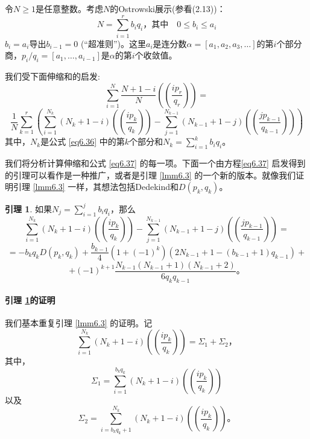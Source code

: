 \documentclass[11pt,a4paper]{article}
\theoremstyle{definition}
\newtheorem{lemma}{\textbf{引理}}[section]
\newcommand{\refeq}[1]{公式 \ref{#1}}
\newcommand{\reflmm}[1]{引理 \ref{#1}}
\numberwithin{equation}{section}
\newcommand{\comma}{\text{，}}
\newcommand{\juhao}{\text{。}}
\newcommand{\parquo}[1]{$ p_{#1}/q_{#1}=\left[a_{1},\ldots,a_{#1-1}\right] $}
\newcommand{\myone}[1]{\left(-1\right)^{#1}}
\newcommand{\ddbrace}[1]{\left(\left(#1\right)\right)}
\begin{document}
令$ N\geq1 $是任意整数。考虑$ N $的Ostrowski展示(参看(2.13))：
\begin{equation}\label{eq6.36}
N=\sum_{i=1}^{r}b_{i}q_{i}\comma \text{其中} \quad 0\leq b_{i}\leq a_{i} 
\end{equation}
$ b_{i}=a_{i} $导出$ b_{i-1}=0 $ (``超准则'')。这里$ a_{i} $是连分数$ \alpha=\left[a_{1},a_{2},a_{3},\ldots\right]$的第$ i $个部分商，\parquo{i}是$ \alpha $的第$ i $个收敛值。

我们受下面伸缩和的启发:
\begin{equation}\label{eq6.37}
\sum_{i=1}^{N}\dfrac{N+1-i}{N}\ddbrace{\dfrac{ip_{r}}{q_{r}}}=
\end{equation}
\[ \dfrac{1}{N}\sum_{k=1}^{r}\left(\sum_{i=1}^{N_{k}}\left(N_{k}+1-i\right)\ddbrace{\dfrac{ip_{k}}{q_{k}}}-\sum_{j=1}^{N_{k-1}}\left(N_{k-1}+1-j\right)\ddbrace{\dfrac{jp_{k-1}}{q_{k-1}}}\right) \]
其中，$ N_{k} $是\refeq{eq6.36} 中的第$ k  $个部分和$ N_{k}=\sum_{i=1}^{k}b_{i}q_{i} $。

我们将分析计算伸缩和\refeq{eq6.37} 的每一项。下面一个由方程\ref{eq6.37} 启发得到的引理可以看作是一种推广，或者是\reflmm{lmm6.3} 的一个新的版本。就像我们证明\reflmm{lmm6.3} 一样，其想法包括Dedekind和$ D\left(p_{k},q_{k}\right) $。
\begin{lemma}\label{lmm6.4}
	如果$ N_{j}=\sum_{i=1}^{j}b_{i}q_{i} $，那么
\[ 	\sum_{i=1}^{N_{k}}\left(N_{k}+1-i\right)\ddbrace{\dfrac{ip_{k}}{q_{k}}}-\sum_{j=1}^{N_{k-1}}\left(N_{k-1}+1-j\right)\ddbrace{\dfrac{jp_{k-1}}{q_{k-1}}}= \]
\[ =-b_{k}q_{k}D\left(p_{k},q_{k}\right)+\dfrac{b_{k-1}}{4}\left(1+\myone{k}\right)\left(2N_{k-1}+1-\left(b_{k-1}+1\right)q_{k-1}\right)+ \]
	\begin{equation}\label{eq6.38}
	+\myone{k+1}\dfrac{N_{k-1}\left(N_{k-1}+1\right)\left(N_{k-1}+2\right)}{6q_{k}q_{k-1}}\juhao
	\end{equation}
\end{lemma}

\paragraph{\reflmm{lmm6.4}的证明} 我们基本重复\reflmm{lmm6.3} 的证明。记
\begin{equation}\label{eq6.39}
	\sum_{i=1}^{N_{k}}\left(N_{k}+1-i\right)\ddbrace{\dfrac{ip_{k}}{q_{k}}}=\Sigma_{1}+\Sigma_{2}\comma
\end{equation}
其中，
\[ \Sigma_{1}=\sum_{i=1}^{b_{k}q_{k}}\left(N_{k}+1-i\right)\ddbrace{\dfrac{ip_{k}}{q_{k}}}\]
以及
\[ \Sigma_{2}=\sum_{i=b_{k}q_{k}+1}^{N_{k}}\left(N_{k}+1-i\right)\ddbrace{\dfrac{ip_{k}}{q_{k}}}\juhao\]
\end{document}
